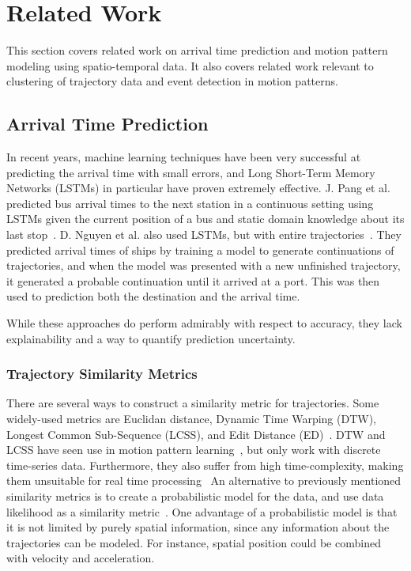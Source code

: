 \chapter{Related Work}
\label{cha:theory}

This section covers related work on arrival time prediction 
and motion pattern modeling using spatio-temporal data. It
also covers related work relevant to clustering of trajectory data
and event detection in motion patterns.

\section{Arrival Time Prediction}
In recent years, machine learning techniques have been very successful
at predicting the arrival time with small errors, and Long Short-Term 
Memory Networks (LSTMs) in particular have proven
extremely effective. J. Pang et al. predicted bus arrival times to the next station in a
continuous setting using LSTMs given the current position of a bus and static domain knowledge
about its last stop~\cite{pang2018learning}.
D. Nguyen et al. also used LSTMs, but with entire
trajectories~\cite{Nguyen2018Jun}. They predicted arrival times of
ships by training a model to generate continuations of trajectories, and  
when the model was presented with a new unfinished trajectory, it generated a
probable continuation until it arrived at a port. This was then used to
prediction both the destination and the arrival time.

While these approaches do perform admirably with respect to accuracy, 
they lack explainability and a way to quantify prediction uncertainty.

\subsection{Trajectory Similarity Metrics}\label{sec:traj-sim-metrics}
There are several ways to construct a similarity metric for
trajectories. Some widely-used metrics are Euclidan distance,
Dynamic Time Warping (DTW), Longest Common Sub-Sequence (LCSS), and Edit
Distance (ED)~\cite{Wang2013Jan}. DTW and LCSS have seen use in
motion pattern learning~\cite{Tang2018Aug, Vlachos2002Feb}, but only
work with discrete time-series data. Furthermore, they also suffer
from high time-complexity, making them unsuitable for real time processing~\cite{Zhang2006Aug}
An alternative to previously mentioned similarity metrics is to create
a probabilistic model for the data, and use data
likelihood as a similarity metric~\cite{Kim2011Nov, Tran2014Jun, Tiger2015Jul}.
One advantage of a probabilistic model is that it is not limited by
purely spatial information, since any information about the trajectories can
be modeled. For instance, spatial position could be combined
with velocity and acceleration. 

